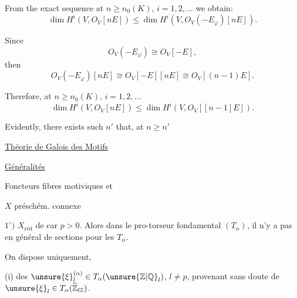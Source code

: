 From the exact sequence
at $n\geq n_0(K)$, $i=1,2,\ldots$ we obtain:
\[
\dim H^i(V,O_V[nE])\leq\dim H^i(V,O_V(-E_{\varphi})[nE]).
\]

Since
\[
O_V(-E_{\varphi})\cong O_V[-E],
\]
then
\[
O_V(-E_{\varphi})[nE]\cong O_V[-E][nE]\cong O_V[(n-1)E].
\]

Therefore, at $n\geq n_0(K)$, $i=1,2,\ldots$
\[
\dim H^i(V,O_V[nE])\leq\dim H^i(V,O_V[[n-1]E]).
\]

Evidently, there exists such $n'$ that, at $n\geq n'$


\uline{Théorie de Galois des Motifs}

\uline{Généralités}


Foncteurs fibres motiviques
et  


$X$ préschém. connexe 

$1^\circ)$ $X_{\mathrm{réd}}$ de car $p>0$. Alors dans le pro-torseur fondamental
$(T_\alpha)$, il n'y a pas en général de sections pour les $T_\alpha$.

\margin{$\unsure{\ast}$}
On dispose uniquement, 

(i) des $\unsure{\xi}_l^{(\alpha)}\in T_\alpha(\unsure{\mathbb Z|\mathbb Q}_l)$,
$l\neq p$, provenant sans doute
de $\unsure{\xi}_l\in T_\alpha(\widetilde{\mathbb Z}_{l\mathbb Z})$.


